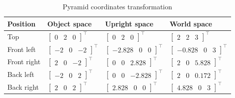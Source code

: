 \documentclass[a4paper,11pt]{article}
\begin{document}
\begin{table}[H]
\centering
\begin{tabular}{|l|l|l|l|}
\hline
\textbf{Position} & \textbf{Object space} & \textbf{Upright space} & \textbf{World space} \\ \hline
Top & $\begin{bmatrix}0 & 2 & 0\end{bmatrix}^\intercal$ & $\begin{bmatrix}0 & 2 & 0\end{bmatrix}^\intercal$ & $\begin{bmatrix}2 & 2 & 3\end{bmatrix}^\intercal$ \\ \hline
Front left & $\begin{bmatrix}-2 & 0 & -2\end{bmatrix}^\intercal$ & $\begin{bmatrix}-2.828 & 0 & 0\end{bmatrix}^\intercal$ & $\begin{bmatrix}-0.828 & 0 & 3\end{bmatrix}^\intercal$ \\ \hline
Front right & $\begin{bmatrix}2 & 0 & -2\end{bmatrix}^\intercal$ & $\begin{bmatrix}0 & 0 & 2.828\end{bmatrix}^\intercal$ & $\begin{bmatrix}2 & 0 & 5.828\end{bmatrix}^\intercal$ \\ \hline
Back left & $\begin{bmatrix}-2 & 0 & 2\end{bmatrix}^\intercal$ & $\begin{bmatrix}0 & 0 & -2.828\end{bmatrix}^\intercal$ & $\begin{bmatrix}2 & 0 & 0.172\end{bmatrix}^\intercal$ \\ \hline
Back right & $\begin{bmatrix}2 & 0 & 2\end{bmatrix}^\intercal$ & $\begin{bmatrix}2.828 & 0 & 0\end{bmatrix}^\intercal$ & $\begin{bmatrix}4.828 & 0 & 3\end{bmatrix}^\intercal$ \\ \hline
\end{tabular}
\caption{Pyramid coordinates transformation}
\label{tab:pyramid-coordinates-transformation}
\end{table}
\end{document}
